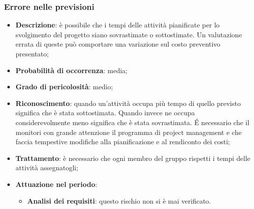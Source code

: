 		\subsubsection{Errore nelle previsioni}
		\begin{itemize} 
			\item \textbf{Descrizione}: è possibile che i tempi delle attività pianificate per lo svolgimento del progetto siano sovrastimate o sottostimate. Un valutazione errata di queste può comportare una variazione sul costo preventivo presentato;
			\item \textbf{Probabilità di occorrenza}: media;
			\item \textbf{Grado di pericolosità}: medio;
			\item \textbf{Riconoscimento}: quando un'attività occupa più tempo di quello previsto significa che è stata sottostimata. Quando invece ne occupa considerevolmente meno significa che è stata sovrastimata. \'E necessario che il \textit{\Res} monitori con grande attenzione il programma di project management e che faccia tempestive modifiche alla pianificazione e al rendiconto dei costi;
			\item \textbf{Trattamento}: è necessario che ogni membro del gruppo rispetti i tempi delle attività assegnatogli;
			\item \textbf{Attuazione nel periodo}:
			\begin{itemize}
				\item \textbf{Analisi dei requisiti}: questo rischio non si è mai verificato.
			\end{itemize}
		\end{itemize}
